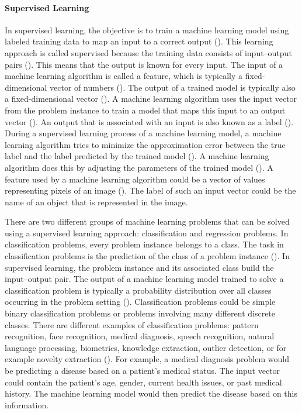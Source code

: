 \documentclass{BachelorBUI}
\begin{document}
            \paragraph{Supervised Learning}
                
                In supervised learning, the objective is to train a machine learning model using labeled training data to map an input to a correct output (\cite{Alpaydin:2014}). This learning approach is called supervised because the training data consists of input--output pairs (\cite{Murphy:2022}). This means that the output is known for every input. The input of a machine learning algorithm is called a feature, which is typically a fixed-dimensional vector of numbers (\cite{Murphy:2022}). The output of a trained model is typically also a fixed-dimensional vector (\cite{Bishop:2006}). A machine learning algorithm uses the input vector from the problem instance to train a model that maps this input to an output vector (\cite{Bishop:2006}). An output that is associated with an input is also known as a label (\cite{Murphy:2022}). During a supervised learning process of a machine learning model, a machine learning algorithm tries to minimize the approximation error between the true label and the label predicted by the trained model (\cite{Alpaydin:2014}). A machine learning algorithm does this by adjusting the parameters of the trained model (\cite{Alpaydin:2014}). A feature used by a machine learning algorithm could be a vector of values representing pixels of an image (\cite{Murphy:2022}). The label of such an input vector could be the name of an object that is represented in the image. 

                There are two different groups of machine learning problems that can be solved using a supervised learning approach: classification and regression problems. In classification problems, every problem instance belongs to a class. The task in classification problems is the prediction of the class of a problem instance (\cite{Goodfellow:2016}). In supervised learning, the problem instance and its associated class build the input--output pair. The output of a machine learning model trained to solve a classification problem is typically a probability distribution over all classes occurring in the problem setting (\cite{Goodfellow:2016}). Classification problems could be simple binary classification problems or problems involving many different discrete classes. There are different examples of classification problems: pattern recognition, face recognition, medical diagnosis, speech recognition, natural language processing, biometrics, knowledge extraction, outlier detection, or for example novelty extraction (\cite{Alpaydin:2014}). For example, a medical diagnosis problem would be predicting a disease based on a patient's medical status. The input vector could contain the patient's age, gender, current health issues, or past medical history. The machine learning model would then predict the disease based on this information.
\end{document}
